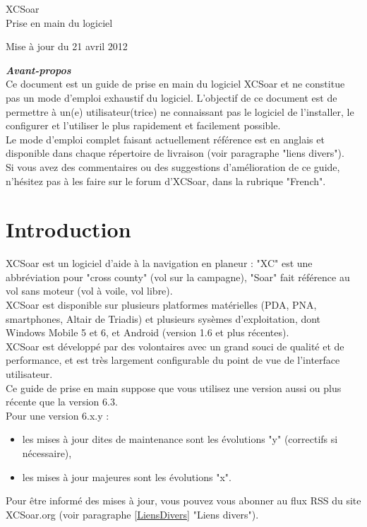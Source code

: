 \documentclass{article}
\begin{document}
%
\begin{center}
%
%
\Huge
XCSoar\\
\normalsize
Prise en main du logiciel
\end{center}
%
\begin{flushright}
Mise à jour du 21 avril 2012
\end{flushright}
%
\pagebreak
\noindent
\textbf{\textit{Avant-propos}}\\
Ce document est un guide de prise en main du logiciel XCSoar et ne constitue pas un mode d'emploi exhaustif du logiciel. L'objectif de ce document est de permettre à un(e) utilisateur(trice) ne connaissant pas le logiciel de l'installer, le configurer et l'utiliser le plus rapidement et facilement possible.\\Le mode d'emploi complet faisant actuellement référence est en anglais et disponible dans chaque répertoire de livraison (voir paragraphe "liens divers").\\Si vous avez des commentaires ou des suggestions d'amélioration de ce guide, n'hésitez pas à les faire sur le forum d'XCSoar, dans la rubrique "French".
%
\section{Introduction}
\noindent
XCSoar est un logiciel d'aide à la navigation en planeur : "XC" est une abbréviation pour "cross county" (vol sur la campagne), "Soar" fait référence au vol sans moteur (vol à voile, vol libre).\\
XCSoar est disponible sur plusieurs platformes matérielles (PDA, PNA, smartphones, Altair de Triadis) et plusieurs sysèmes d'exploitation, dont Windows Mobile 5 et 6, et Android (version 1.6 et plus récentes).\\
XCSoar est développé par des volontaires avec un grand souci de qualité et de performance, et est très largement configurable du point de vue de l'interface utilisateur.\\
Ce guide de prise en main suppose que vous utilisez une version aussi ou plus récente que la version 6.3.\\
Pour une version 6.x.y :
\begin{itemize}
\item les mises à jour dites de maintenance sont les évolutions "y" (correctifs si nécessaire),
\item les mises à jour majeures sont les évolutions "x".
\end{itemize}
%
Pour être informé des mises à jour, vous pouvez vous abonner au flux RSS du site XCSoar.org (voir paragraphe \ref{LiensDivers} "Liens divers").\\
%
\end{document}
